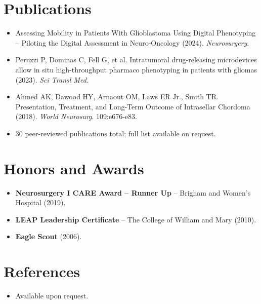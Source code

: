 \documentclass[11pt,a4paper,sans]{moderncv}
\begin{document}
\section{Publications}
\vspace{1pt}
\begin{itemize}
\item Assessing Mobility in Patients With Glioblastoma Using Digital Phenotyping -- Piloting the Digital Assessment in Neuro-Oncology (2024). \textit{Neurosurgery}.
\item Peruzzi P, Dominas C, Fell G, et al. Intratumoral drug-releasing microdevices allow in situ high-throughput pharmaco phenotyping in patients with gliomas (2023). \textit{Sci Transl Med}.
\item Ahmed AK, Dawood HY, Arnaout OM, Laws ER Jr., Smith TR. Presentation, Treatment, and Long-Term Outcome of Intrasellar Chordoma (2018). \textit{World Neurosurg}. 109:e676-e83.
\item 30 peer-reviewed publications total; full list available on request.
\end{itemize}


\section{Honors and Awards}
\vspace{1pt}
\begin{itemize}
\item{\textbf{Neurosurgery I CARE Award -- Runner Up} -- Brigham and Women's Hospital (2019).}
\item{\textbf{LEAP Leadership Certificate} -- The College of William and Mary (2010).}
\item{\textbf{Eagle Scout} (2006).}
\end{itemize}


\section{References}
\vspace{1pt}
\begin{itemize}
\item{Available upon request.}
\end{itemize}
\end{document}
